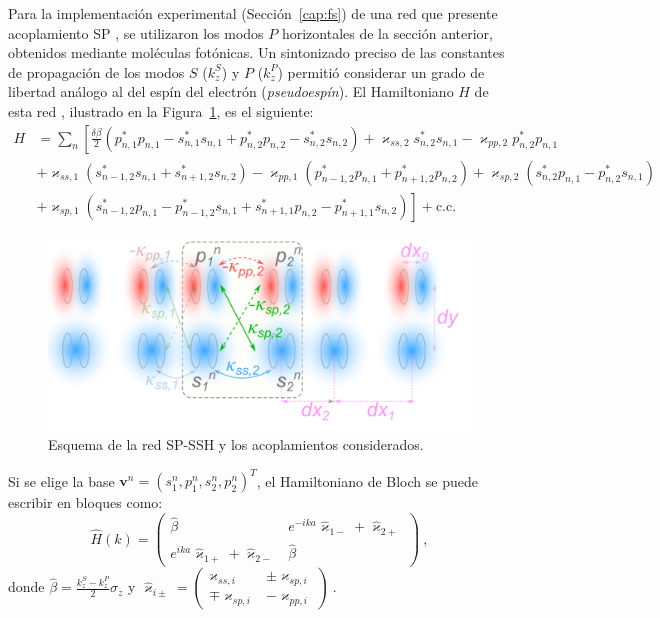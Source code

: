 Para la implementación experimental (Sección~\ref{cap:fs}) de una red que presente acoplamiento SP \citep{interorbital, toporusos, SPSSH}, se utilizaron los modos $P$ horizontales de la sección anterior, obtenidos mediante moléculas fotónicas. Un sintonizado preciso de las constantes de propagación de los modos $S$ ($k_z^S$) y $P$ ($k_z^P$) permitió considerar un grado de libertad análogo al del espín del electrón (\textit{pseudoespín}). El Hamiltoniano $H$ de esta red \citep{SPSSH}, ilustrado en la Figura~\ref{fig:sp-ssh-model}, es el siguiente:
\begin{align*}
	H &= \sum_n \left[\frac{\delta\beta}{2} \left( p^*_{n, 1} p_{n, 1} - s^*_{n, 1} s_{n, 1} + p^*_{n, 2} p_{n, 2} - s^*_{n, 2} s_{n, 2} \right) + \varkappa_{ss, 2}s^*_{n, 2} s_{n, 1} - \varkappa_{pp, 2}p^*_{n, 2} p_{n, 1} \right. \\
	&+ \varkappa_{ss, 1} \left( s_{n-1, 2}^*s_{n, 1} + s_{n+1, 2}^*s_{n, 2} \right) - \varkappa_{pp, 1} \left( p_{n-1, 2}^*p_{n, 1} + p_{n+1, 2}^*p_{n, 2} \right) + \varkappa_{sp, 2} \left( s_{n, 2}^* p_{n, 1} - p_{n, 2}^* s_{n, 1} \right) \\
	&+ \left. \varkappa_{sp, 1} \left( s_{n-1, 2}^* p_{n, 1} - p_{n-1, 2}^* s_{n, 1} + s_{n+1, 1}^*p_{n, 2} - p_{n+1, 1}^* s_{n, 2} \right) \right] + \text{c.c.}
\end{align*}

\begin{figure}[H]
	\centering
	\includegraphics[width=0.7\linewidth]{media/ssh_sp_model}
	\caption{Esquema de la red SP-SSH y los acoplamientos considerados. \label{fig:sp-ssh-model}}
\end{figure} \vspace{-2ex}
Si se elige la base $\mathbf{v}^n = \left( s_1^n, p_1^n, s_2^n, p_2^n \right)^T$, el Hamiltoniano de Bloch se puede escribir en bloques como:
\begin{equation*}
	\hat{H}(k) = \begin{pmatrix}
		\hat{\beta} & e^{-ika} \hat{\varkappa}_{1-} + \hat{\varkappa}_{2+} \\
		e^{ika} \hat{\varkappa}_{1+} + \hat{\varkappa}_{2-} & \hat{\beta}
	\end{pmatrix} \ ,
\end{equation*}
donde $\hat{\beta} = \frac{k_z^S - k_z^P}{2} \hat{\sigma}_z$ y $\hat{\varkappa}_{i\pm} = \begin{pmatrix}
	\varkappa_{ss, i} & \pm\varkappa_{sp, i} \\
	\mp\varkappa_{sp, i} & - \varkappa_{pp, i}
\end{pmatrix} \ .$

